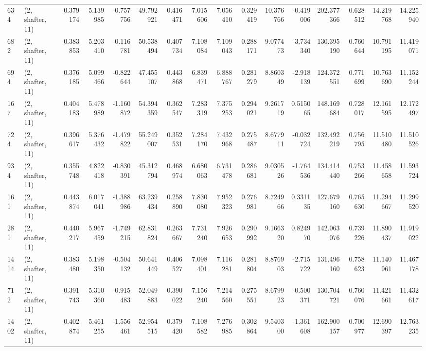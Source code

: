 \begin{tabular}{llrrrrrrrrrrrrrr}
634  &  (2, shafter, 11) &   0.379174 &   5.139985 &  -0.757756 &     49.792921 &    0.416471 &    7.015606 &    7.056410 &  0.329419 &  10.376766 &  -0.419006 &   202.377366 &   0.628512 &  14.219768 &  14.225940 \\
682  &  (2, shafter, 11) &   0.383853 &   5.203410 &  -0.116781 &     50.538494 &    0.407734 &    7.108084 &    7.109043 &  0.288171 &   9.077473 &  -3.734340 &   130.395190 &   0.760644 &  10.791195 &  11.419071 \\
694  &  (2, shafter, 11) &   0.376185 &   5.099466 &  -0.822644 &     47.455107 &    0.443868 &    6.839471 &    6.888767 &  0.281279 &   8.860349 &  -2.918139 &   124.372551 &   0.771699 &  10.763690 &  11.152244 \\
167  &  (2, shafter, 11) &   0.404183 &   5.478989 &  -1.160872 &     54.394359 &    0.362547 &    7.283319 &    7.375253 &  0.294021 &   9.261719 &   0.515065 &   148.169684 &   0.728017 &  12.161595 &  12.172497 \\
724  &  (2, shafter, 11) &   0.396617 &   5.376432 &  -1.479822 &     55.249007 &    0.352531 &    7.284170 &    7.432968 &  0.275487 &   8.677911 &  -0.032724 &   132.492219 &   0.756795 &  11.510480 &  11.510526 \\
934  &  (2, shafter, 11) &   0.355748 &   4.822418 &  -0.830391 &     45.312794 &    0.468974 &    6.680063 &    6.731478 &  0.286681 &   9.030526 &  -1.764536 &   134.414440 &   0.753266 &  11.458658 &  11.593724 \\
161  &  (2, shafter, 11) &   0.443874 &   6.017041 &  -1.388986 &     63.239434 &    0.258890 &    7.830080 &    7.952323 &  0.276981 &   8.724966 &   0.331135 &   127.679160 &   0.765630 &  11.294667 &  11.299520 \\
281  &  (2, shafter, 11) &   0.440217 &   5.967459 &  -1.749215 &     62.831824 &    0.263667 &    7.731240 &    7.926653 &  0.290992 &   9.166320 &   0.824970 &   142.063076 &   0.739226 &  11.890437 &  11.919022 \\
1414 &  (2, shafter, 11) &   0.383480 &   5.198350 &  -0.504132 &     50.641449 &    0.406527 &    7.098401 &    7.116281 &  0.281804 &   8.876903 &  -2.715722 &   131.496160 &   0.758623 &  11.140961 &  11.467178 \\
712  &  (2, shafter, 11) &   0.391743 &   5.310360 &  -0.915483 &     52.049883 &    0.390022 &    7.156240 &    7.214560 &  0.275551 &   8.679923 &  -0.500371 &   130.704721 &   0.760076 &  11.421661 &  11.432617 \\
1402 &  (2, shafter, 11) &   0.402874 &   5.461255 &  -1.556461 &     52.954515 &    0.379420 &    7.108582 &    7.276985 &  0.302864 &   9.540300 &  -1.361608 &   162.900157 &   0.700977 &  12.690397 &  12.763235 \\

\end{tabular}
